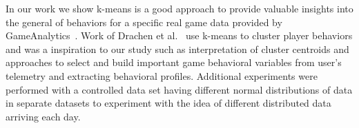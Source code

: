 In our work we show k-means is a good approach to provide valuable insights into the general of behaviors for a specific real game data provided by GameAnalytics~\citep{GA2013}. Work of Drachen et al.~\citep{Drachen:2012, Drachen:2013} use k-means to cluster player behaviors and was a inspiration to our study such as interpretation of cluster centroids and approaches to select and build important game behavioral variables from user's telemetry and extracting behavioral profiles. Additional experiments were performed with a controlled data set having different normal distributions of data in separate datasets to experiment with the idea of different distributed data arriving each day.